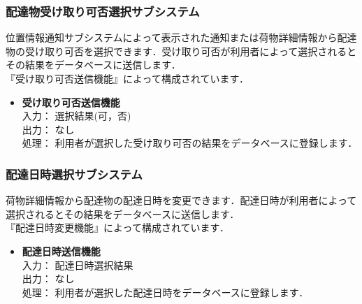 \documentclass[a4j,titlepage]{jarticle}
\begin{document}
\subsubsection{配達物受け取り可否選択サブシステム}
位置情報通知サブシステムによって表示された通知または荷物詳細情報から配達物の受け取り可否を選択できます．受け取り可否が利用者によって選択されるとその結果をデータベースに送信します．\\
『受け取り可否送信機能』によって構成されています．
\begin{itemize}
\item \textbf{受け取り可否送信機能} \\
入力： 選択結果(可，否) \\
出力： なし \\
処理： 利用者が選択した受け取り可否の結果をデータベースに登録します．
\end{itemize}

\subsubsection{配達日時選択サブシステム}
荷物詳細情報から配達物の配達日時を変更できます．配達日時が利用者によって選択されるとその結果をデータベースに送信します．\\
『配達日時変更機能』によって構成されています．
\begin{itemize}
\item \textbf{配達日時送信機能} \\
入力： 配達日時選択結果\\
出力： なし \\
処理： 利用者が選択した配達日時をデータベースに登録します．
\end{itemize}
\end{document}
